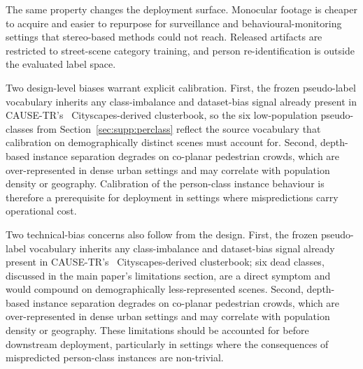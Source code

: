 \documentclass{article}
\begin{document}
The same property changes the deployment surface. Monocular footage is cheaper to acquire and easier to repurpose for surveillance and behavioural-monitoring settings that stereo-based methods could not reach. Released artifacts are restricted to street-scene category training, and person re-identification is outside the evaluated label space.

Two design-level biases warrant explicit calibration. First, the frozen pseudo-label vocabulary inherits any class-imbalance and dataset-bias signal already present in CAUSE-TR's~\cite{kim2024cause} Cityscapes-derived clusterbook, so the six low-population pseudo-classes from Section~\ref{sec:supp:perclass} reflect the source vocabulary that calibration on demographically distinct scenes must account for. Second, depth-based instance separation degrades on co-planar pedestrian crowds, which are over-represented in dense urban settings and may correlate with population density or geography. Calibration of the person-class instance behaviour is therefore a prerequisite for deployment in settings where mispredictions carry operational cost.

Two technical-bias concerns also follow from the design. First, the frozen pseudo-label vocabulary inherits any class-imbalance and dataset-bias signal already present in CAUSE-TR's~\cite{kim2024cause} Cityscapes-derived clusterbook; six dead classes, discussed in the main paper's limitations section, are a direct symptom and would compound on demographically less-represented scenes. Second, depth-based instance separation degrades on co-planar pedestrian crowds, which are over-represented in dense urban settings and may correlate with population density or geography. These limitations should be accounted for before downstream deployment, particularly in settings where the consequences of mispredicted person-class instances are non-trivial.
\end{document}
